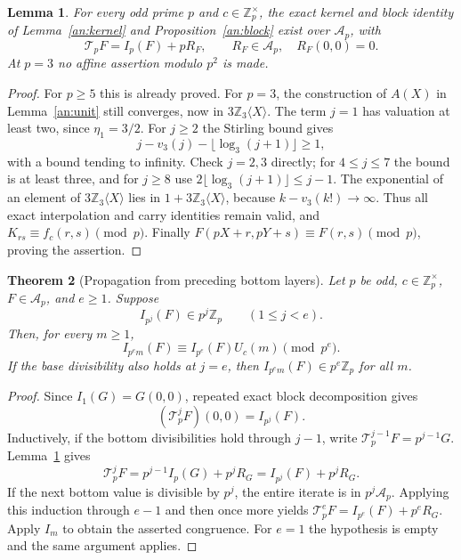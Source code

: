 \documentclass[11pt,a4paper]{article}
\newtheorem{theorem}{Theorem}[section]
\newtheorem{lemma}[theorem]{Lemma}
\theoremstyle{remark}\newtheorem{remark}[theorem]{Remark}
\newcommand{\Z}{\mathbb Z}
\begin{document}
\begin{lemma}\label{layer:odd}
For every odd prime \(p\) and \(c\in\Z_p^\times\), the exact kernel and
block identity of Lemma~\ref{an:kernel} and Proposition~\ref{an:block}
exist over \(\mathcal A_p\), with
\[
 \mathcal T_pF=I_p(F)+pR_F,\qquad R_F\in\mathcal A_p,\quad R_F(0,0)=0.
\]
At \(p=3\) no affine assertion modulo \(p^2\) is made.
\end{lemma}
\begin{proof}
For \(p\ge5\) this is already proved. For \(p=3\), the construction of
\(A(X)\) in Lemma~\ref{an:unit} still converges, now in
\(3\Z_3\langle X\rangle\). The term \(j=1\) has valuation at least two,
since \(\eta_1=3/2\). For \(j\ge2\) the Stirling bound gives
\[
 j-v_3(j)-\lfloor\log_3(j+1)\rfloor\ge1,
\]
with a bound tending to infinity. Check \(j=2,3\) directly; for \(4\le j\le7\)
the bound is at least three, and for \(j\ge8\) use
\(2\lfloor\log_3(j+1)\rfloor\le j-1\).
The exponential of an element of \(3\Z_3\langle X\rangle\) lies in
\(1+3\Z_3\langle X\rangle\), because \(k-v_3(k!)\to\infty\).
Thus all exact interpolation and carry identities remain valid,
and \(K_{rs}\equiv f_c(r,s)\pmod p\).
Finally \(F(pX+r,pY+s)\equiv F(r,s)\pmod p\), proving the assertion.
\end{proof}

\begin{theorem}[Propagation from preceding bottom layers]\label{layer:prop}
Let \(p\) be odd, \(c\in\Z_p^\times\), \(F\in\mathcal A_p\), and \(e\ge1\).
Suppose
\[
 I_{p^j}(F)\in p^j\Z_p\qquad(1\le j<e).
\]
Then, for every \(m\ge1\),
\[
 I_{p^em}(F)\equiv I_{p^e}(F)U_c(m)\pmod{p^e}.
\]
If the base divisibility also holds at \(j=e\), then
\(I_{p^em}(F)\in p^e\Z_p\) for all \(m\).
\end{theorem}
\begin{proof}
Since \(I_1(G)=G(0,0)\), repeated exact block decomposition gives
\[
                 (\mathcal T_p^jF)(0,0)=I_{p^j}(F).
\]
Inductively, if the bottom divisibilities hold through \(j-1\),
write \(\mathcal T_p^{j-1}F=p^{j-1}G\). Lemma~\ref{layer:odd} gives
\[
 \mathcal T_p^jF
 =p^{j-1}I_p(G)+p^jR_G
 =I_{p^j}(F)+p^jR_G.
\]
If the next bottom value is divisible by \(p^j\), the entire iterate
is in \(p^j\mathcal A_p\). Applying this induction through \(e-1\)
and then once more yields
\(\mathcal T_p^eF=I_{p^e}(F)+p^eR_G\).
Apply \(I_m\) to obtain the asserted congruence.
For \(e=1\) the hypothesis is empty and the same argument applies.
\end{proof}
\end{document}
